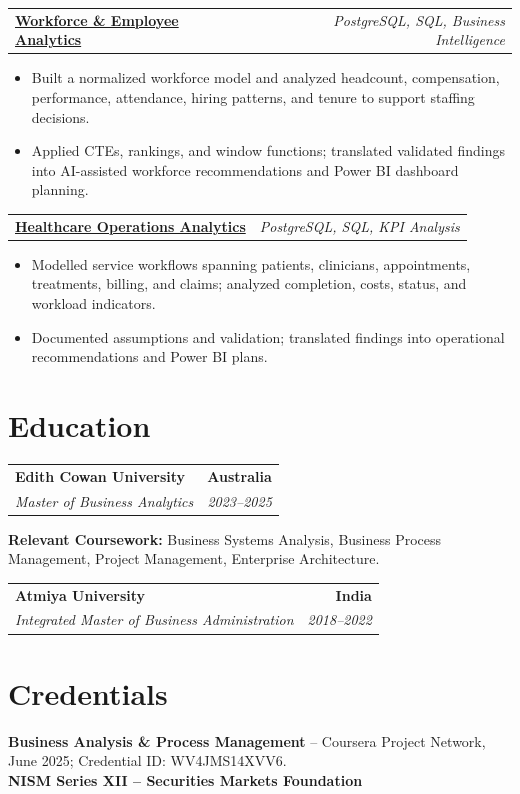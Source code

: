 \documentclass[letterpaper,10pt]{article}
\makeatletter
\newcommand{\role}[4]{%
  \begin{tabularx}{\textwidth}{@{}Xr@{}}
    \textbf{#1} & \textbf{#2} \\
    \textit{#3} & \textit{#4}
  \end{tabularx}\vspace{-1pt}
}
\newcommand{\project}[2]{%
  \begin{tabularx}{\textwidth}{@{}Xr@{}}
    \textbf{#1} & \textit{#2}
  \end{tabularx}\vspace{-1pt}
}
\makeatother
\begin{document}
\project{\href{https://github.com/jainalimehta/HR-Analytics}{Workforce \& Employee Analytics}}{PostgreSQL, SQL, Business Intelligence}
\begin{itemize}
  \item Built a normalized workforce model and analyzed headcount, compensation, performance, attendance, hiring patterns, and tenure to support staffing decisions.
  \item Applied CTEs, rankings, and window functions; translated validated findings into AI-assisted workforce recommendations and Power BI dashboard planning.
\end{itemize}
\vspace{1pt}

\project{\href{https://github.com/jainalimehta/Healthcare-Analytics}{Healthcare Operations Analytics}}{PostgreSQL, SQL, KPI Analysis}
\begin{itemize}
  \item Modelled service workflows spanning patients, clinicians, appointments, treatments, billing, and claims; analyzed completion, costs, status, and workload indicators.
  \item Documented assumptions and validation; translated findings into operational recommendations and Power BI plans.
\end{itemize}

\section{Education}
\role{Edith Cowan University}{Australia}{Master of Business Analytics}{2023--2025}
\small\textbf{Relevant Coursework:} Business Systems Analysis, Business Process Management, Project Management, Enterprise Architecture.\\[2pt]
\role{Atmiya University}{India}{Integrated Master of Business Administration}{2018--2022}

\section{Credentials}
\small\textbf{Business Analysis \& Process Management} -- Coursera Project Network, June 2025; Credential ID: WV4JMS14XVV6.\\[-0.2pt]
\small\textbf{NISM Series XII -- Securities Markets Foundation}
\end{document}
